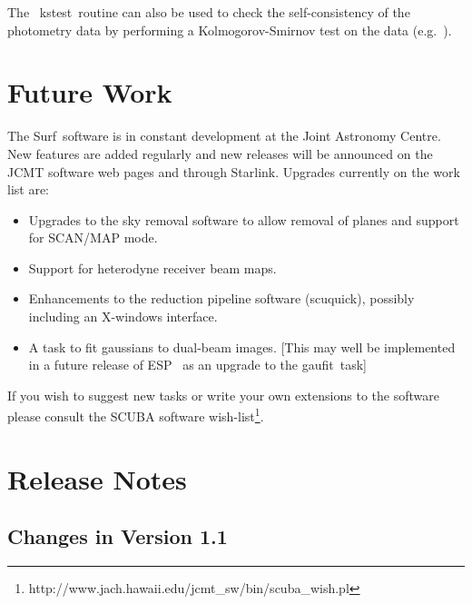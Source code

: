 \documentclass[twoside,11pt]{article}
\newcommand{\scusoft}          {{\sc Surf}}
\newcommand{\Kappa}{\xref{{\sc{Kappa}}}{sun95}{}}
\newcommand{\ESP}{\xref{ESP}{sun180}{}}
\newcommand{\task}[1]{{\sf #1}}
\newcommand{\scuquick}{\htmlref{\task{scuquick}}{SCUQUICK}}
\newcommand{\kstest}{\xref{\task{kstest}}{sun95}{KSTEST}}
\newcommand{\gaufit}{\xref{\task{gaufit}}{sun180}{GAUFIT}}
\newcommand{\htmladdnormallinkfoot}[2]{#1\footnote{#2}}
\newcommand{\htmlref}[2]{#1}
\newcommand{\xref}[3]{#1}
\newcommand{\xlabel}[1]{}
\begin{document}
The \Kappa\ \kstest\ routine can also be used to check the
self-consistency of the photometry data by performing a Kolmogorov-Smirnov
test on the data (e.g.\ \cite{dhh}).


\section{\xlabel{future}Future Work\label{future}}

The \scusoft\ software is in constant development at the
Joint Astronomy Centre. New features are added regularly and new releases
will be announced on the JCMT software web pages and through Starlink.
Upgrades currently on the work list are:

\begin{itemize}

\item Upgrades to the sky removal software to allow removal of planes 
      and support for SCAN/MAP mode.

\item Support for heterodyne receiver beam maps.

\item Enhancements to the reduction pipeline software (\scuquick), possibly
      including an X-windows interface.

\item A task to fit gaussians to dual-beam images. [This may well be
implemented in a future release of \ESP\ \cite{esp} as an upgrade to the
\gaufit\ task]

\end{itemize}

If you wish to suggest new tasks or write your own extensions to the 
software please consult the \htmladdnormallinkfoot{SCUBA software
wish-list}{http://www.jach.hawaii.edu/jcmt\_sw/bin/scuba\_wish.pl}.

\section{\xlabel{relnotes}Release Notes\label{relnotes}}

\subsection{Changes in Version 1.1}
\end{document}
